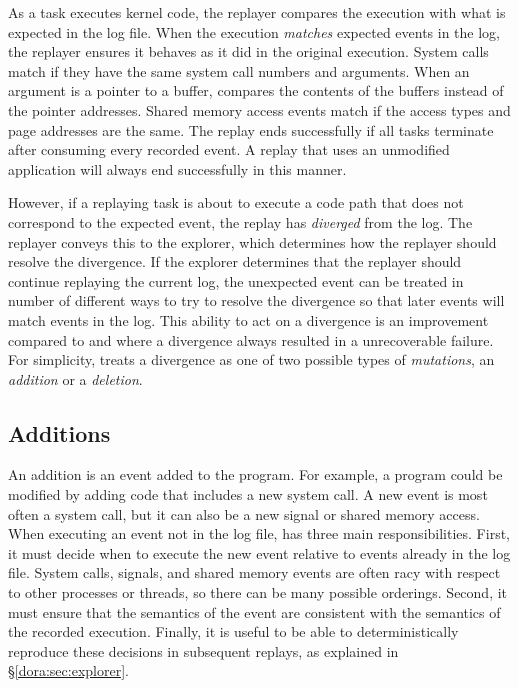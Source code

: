 As a task executes kernel code, the replayer compares the execution
with what is expected in the log file.  When the execution
\emph{matches} expected events in the log, the 
replayer ensures it behaves as it did in the original execution.  
System calls match if they have the same system call numbers and
arguments. When an argument is a pointer to a buffer, {\dora}
compares the contents of the buffers instead of the pointer addresses.
Shared memory access events match if the access types and page
addresses are the same.  The replay ends successfully if all tasks
terminate after consuming every recorded event. A replay that uses an
unmodified application will always end successfully in this manner.

However, if a replaying task is about to execute a code path that does
not correspond to the expected event, the replay has \emph{diverged}
from the log.  The replayer conveys this to the explorer, which
determines how the replayer should resolve the divergence.
If the explorer determines that the replayer should continue
replaying the current log, the unexpected event can be treated in
number of different ways to try to resolve the divergence so that
later events will match events in the log.
This ability to act on a divergence is an improvement compared to \scribe and
\racepro where a divergence always resulted in a unrecoverable failure.
For simplicity, {\dora}
treats a divergence as one of two possible types of \emph{mutations},
an \emph{addition} or a \emph{deletion}.  

\subsection{Additions} \label{dora:sec:additions}
An addition is an event added to the program.  For example, a program
could be modified by adding code that includes a new system call.  A
new event is most often a system call, but it can also be a new signal
or shared memory access.  When executing an event not in the log file,
{\dora} has three main responsibilities.  First, it must decide when
to execute the new event relative to events already in the log
file. System calls, signals, and shared memory events are often racy
with respect to other processes or threads, so there can be many
possible orderings.  Second, it must ensure that the semantics of the
event are consistent with the semantics of the recorded execution.
Finally, it is useful to be able to deterministically reproduce these
decisions in subsequent replays, as explained in
\S\ref{dora:sec:explorer}. 


